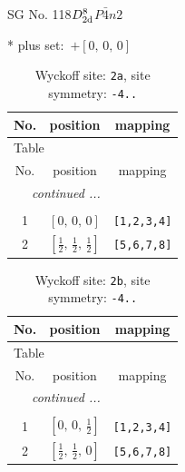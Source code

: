 \documentclass[fleqn,8pt]{jsarticle}
\begin{document}
\setcounter{MaxMatrixCols}{32}

\renewcommand{\tablename}{Table~}
\renewcommand{\figurename}{Figure~}
\begin{center}
\LARGE
SG No. 118\quad$D_{\rm 2d}^{8}$\quad$P\bar{4}n2$\quad[ tetragonal ]
\end{center}
* plus set:\,\,\,$+\left[ 0,\, 0,\, 0 \right]$
\renewcommand{\arraystretch}{1.2}
\begin{longtable}{ccc}
\caption{Wyckoff site: {\tt 2a}, site symmetry: {\tt -4..}}
 \\
 \hline \hline
No. & position & mapping \\ \hline \endfirsthead

\multicolumn{2}{l}{\tablename\ \thetable{}} \\
 \hline \hline
No. & position & mapping \\ \hline \endhead

 \hline \hline
\multicolumn{2}{r}{\footnotesize\it continued ...} \\ \endfoot

 \hline \hline
\multicolumn{2}{r}{} \\ \endlastfoot

1 & $\left[ 0,\, 0,\, 0 \right]$ & {\tt [1,2,3,4]} \\ \hline
2 & $\left[ \frac{1}{2},\, \frac{1}{2},\, \frac{1}{2} \right]$ & {\tt [5,6,7,8]} \\
\end{longtable}
\renewcommand{\arraystretch}{1.2}
\begin{longtable}{ccc}
\caption{Wyckoff site: {\tt 2b}, site symmetry: {\tt -4..}}
 \\
 \hline \hline
No. & position & mapping \\ \hline \endfirsthead

\multicolumn{2}{l}{\tablename\ \thetable{}} \\
 \hline \hline
No. & position & mapping \\ \hline \endhead

 \hline \hline
\multicolumn{2}{r}{\footnotesize\it continued ...} \\ \endfoot

 \hline \hline
\multicolumn{2}{r}{} \\ \endlastfoot

1 & $\left[ 0,\, 0,\, \frac{1}{2} \right]$ & {\tt [1,2,3,4]} \\ \hline
2 & $\left[ \frac{1}{2},\, \frac{1}{2},\, 0 \right]$ & {\tt [5,6,7,8]} \\
\end{longtable}
\end{document}
